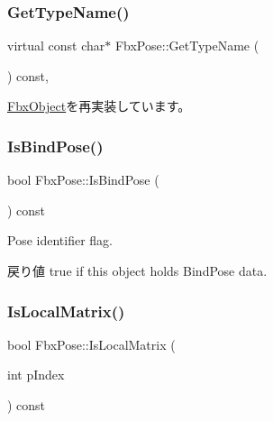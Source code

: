 \subsubsection{\texorpdfstring{Get\+Type\+Name()}{GetTypeName()}}
{\footnotesize\ttfamily virtual const char$\ast$ Fbx\+Pose\+::\+Get\+Type\+Name (\begin{DoxyParamCaption}{ }\end{DoxyParamCaption}) const\hspace{0.3cm}{\ttfamily [protected]}, {\ttfamily [virtual]}}



\hyperlink{class_fbx_object_a817dcfa8f7f7e2437324e1e71377c4b2}{Fbx\+Object}を再実装しています。

\mbox{\label{class_fbx_pose_a6fa3e2bc1aafcdfd958923eb628d6ad5}} 
\subsubsection{\texorpdfstring{Is\+Bind\+Pose()}{IsBindPose()}}
{\footnotesize\ttfamily bool Fbx\+Pose\+::\+Is\+Bind\+Pose (\begin{DoxyParamCaption}{ }\end{DoxyParamCaption}) const}

Pose identifier flag. \begin{DoxyReturn}{戻り値}
{\ttfamily true} if this object holds Bind\+Pose data. 
\end{DoxyReturn}
\mbox{\label{class_fbx_pose_a984ed3b9da9cc827ec15f910e79043c2}} 
\subsubsection{\texorpdfstring{Is\+Local\+Matrix()}{IsLocalMatrix()}}
{\footnotesize\ttfamily bool Fbx\+Pose\+::\+Is\+Local\+Matrix (\begin{DoxyParamCaption}\item[{int}]{p\+Index }\end{DoxyParamCaption}) const}

